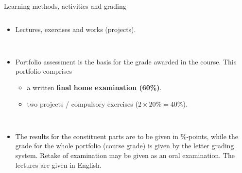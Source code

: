 \documentclass[10pt,ignorenonframetext,]{beamer}
\providecommand{\tightlist}{%
  \setlength{\itemsep}{0pt}\setlength{\parskip}{0pt}}
\begin{document}
\begin{frame}

\begin{block}{Learning methods, activities and grading}

\(~\)

\begin{itemize}
\tightlist
\item
  Lectures, exercises and works (projects).
\end{itemize}

~

\begin{itemize}
\tightlist
\item
  Portfolio assessment is the basis for the grade awarded in the course.
  This portfolio comprises

  \begin{itemize}
  \tightlist
  \item
    a written \textbf{final home examination (60\%)}.
  \item
    two projects / compulsory exercises (\(2\times 20\%=40\%\)).
  \end{itemize}
\end{itemize}

~

\begin{itemize}
\tightlist
\item
  The results for the constituent parts are to be given in \%-points,
  while the grade for the whole portfolio (course grade) is given by the
  letter grading system. Retake of examination may be given as an oral
  examination. The lectures are given in English.
\end{itemize}

\end{block}

\end{frame}
\end{document}
